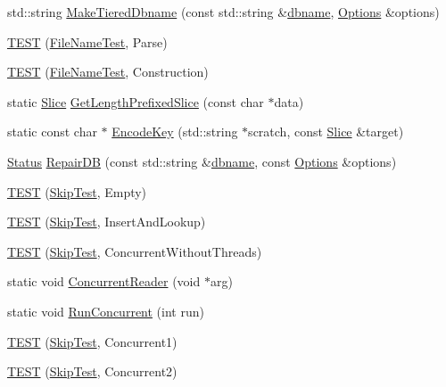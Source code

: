 \begin{DoxyCompactItemize}
\item 
std\+::string \hyperlink{namespaceleveldb_a912fe8ac3cac771902bd383e81143c35}{Make\+Tiered\+Dbname} (const std\+::string \&\hyperlink{c__test_8c_a75d845559336df6843f3b599960f89d2}{dbname}, \hyperlink{structleveldb_1_1_options}{Options} \&options)
\item 
\hyperlink{namespaceleveldb_a28c411f7a30e2e869123a26f6e69e733}{T\+E\+S\+T} (\hyperlink{classleveldb_1_1_file_name_test}{File\+Name\+Test}, Parse)
\item 
\hyperlink{namespaceleveldb_ac77b62bf86349926d23431e4c1c9034a}{T\+E\+S\+T} (\hyperlink{classleveldb_1_1_file_name_test}{File\+Name\+Test}, Construction)
\item 
static \hyperlink{classleveldb_1_1_slice}{Slice} \hyperlink{namespaceleveldb_afe94b0b5eec2b0272aed6f45042a70c8}{Get\+Length\+Prefixed\+Slice} (const char $\ast$data)
\item 
static const char $\ast$ \hyperlink{namespaceleveldb_a1e6f16ce568bfceff4ba4d9623d7d795}{Encode\+Key} (std\+::string $\ast$scratch, const \hyperlink{classleveldb_1_1_slice}{Slice} \&target)
\item 
\hyperlink{classleveldb_1_1_status}{Status} \hyperlink{namespaceleveldb_afb65664fdacb30ab73da9414db5a4208}{Repair\+D\+B} (const std\+::string \&\hyperlink{c__test_8c_a75d845559336df6843f3b599960f89d2}{dbname}, const \hyperlink{structleveldb_1_1_options}{Options} \&options)
\item 
\hyperlink{namespaceleveldb_a94b31a20798f6d72a6cd11c328fcaba7}{T\+E\+S\+T} (\hyperlink{classleveldb_1_1_skip_test}{Skip\+Test}, Empty)
\item 
\hyperlink{namespaceleveldb_a21e74b2de9a6f3db48c8d3ff277a1e0d}{T\+E\+S\+T} (\hyperlink{classleveldb_1_1_skip_test}{Skip\+Test}, Insert\+And\+Lookup)
\item 
\hyperlink{namespaceleveldb_a7a43c7e5a10488ca82072e3cc871fcb2}{T\+E\+S\+T} (\hyperlink{classleveldb_1_1_skip_test}{Skip\+Test}, Concurrent\+Without\+Threads)
\item 
static void \hyperlink{namespaceleveldb_a3b35abcf0dac45639f63dbe6b56a60f8}{Concurrent\+Reader} (void $\ast$arg)
\item 
static void \hyperlink{namespaceleveldb_a46451103024ca345fc73c3a6126b5b48}{Run\+Concurrent} (int run)
\item 
\hyperlink{namespaceleveldb_a1997f90d2777db110a06646c9a3c7ba2}{T\+E\+S\+T} (\hyperlink{classleveldb_1_1_skip_test}{Skip\+Test}, Concurrent1)
\item 
\hyperlink{namespaceleveldb_a0ac3fd3bf30e8efdbdead6e963ffbe3d}{T\+E\+S\+T} (\hyperlink{classleveldb_1_1_skip_test}{Skip\+Test}, Concurrent2)

\end{DoxyCompactItemize}
